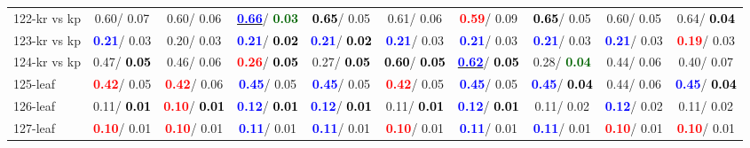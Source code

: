 \begin{table}[h]
\begin{center}
{\begin{tabular}{lc|c|c|c|c|c|c|c|c}
122-kr vs kp &   0.60/  0.07 &   0.60/  0.06 & \underline{\textcolor{blue}{\textbf{  0.66}}}/\textcolor{darkgreen}{\textbf{  0.03}} & \textcolor{black}{\textbf{  0.65}}/  0.05 &   0.61/  0.06 & \textcolor{red}{\textbf{  0.59}}/  0.09 & \textcolor{black}{\textbf{  0.65}}/  0.05 &   0.60/  0.05 &   0.64/\textcolor{black}{\textbf{  0.04}} \\
123-kr vs kp & \textcolor{blue}{\textbf{  0.21}}/  0.03 &   0.20/  0.03 & \textcolor{blue}{\textbf{  0.21}}/\textcolor{black}{\textbf{  0.02}} & \textcolor{blue}{\textbf{  0.21}}/\textcolor{black}{\textbf{  0.02}} & \textcolor{blue}{\textbf{  0.21}}/  0.03 & \textcolor{blue}{\textbf{  0.21}}/  0.03 & \textcolor{blue}{\textbf{  0.21}}/  0.03 & \textcolor{blue}{\textbf{  0.21}}/  0.03 & \textcolor{red}{\textbf{  0.19}}/  0.03 \\
124-kr vs kp &   0.47/\textcolor{black}{\textbf{  0.05}} &   0.46/  0.06 & \textcolor{red}{\textbf{  0.26}}/\textcolor{black}{\textbf{  0.05}} &   0.27/\textcolor{black}{\textbf{  0.05}} & \textcolor{black}{\textbf{  0.60}}/\textcolor{black}{\textbf{  0.05}} & \underline{\textcolor{blue}{\textbf{  0.62}}}/\textcolor{black}{\textbf{  0.05}} &   0.28/\textcolor{darkgreen}{\textbf{  0.04}} &   0.44/  0.06 &   0.40/  0.07 \\ \hline
125-leaf & \textcolor{red}{\textbf{  0.42}}/  0.05 & \textcolor{red}{\textbf{  0.42}}/  0.06 & \textcolor{blue}{\textbf{  0.45}}/  0.05 & \textcolor{blue}{\textbf{  0.45}}/  0.05 & \textcolor{red}{\textbf{  0.42}}/  0.05 & \textcolor{blue}{\textbf{  0.45}}/  0.05 & \textcolor{blue}{\textbf{  0.45}}/\textcolor{black}{\textbf{  0.04}} &   0.44/  0.06 & \textcolor{blue}{\textbf{  0.45}}/\textcolor{black}{\textbf{  0.04}} \\
126-leaf &   0.11/\textcolor{black}{\textbf{  0.01}} & \textcolor{red}{\textbf{  0.10}}/\textcolor{black}{\textbf{  0.01}} & \textcolor{blue}{\textbf{  0.12}}/\textcolor{black}{\textbf{  0.01}} & \textcolor{blue}{\textbf{  0.12}}/\textcolor{black}{\textbf{  0.01}} &   0.11/\textcolor{black}{\textbf{  0.01}} & \textcolor{blue}{\textbf{  0.12}}/\textcolor{black}{\textbf{  0.01}} &   0.11/  0.02 & \textcolor{blue}{\textbf{  0.12}}/  0.02 &   0.11/  0.02 \\
127-leaf & \textcolor{red}{\textbf{  0.10}}/  0.01 & \textcolor{red}{\textbf{  0.10}}/  0.01 & \textcolor{blue}{\textbf{  0.11}}/  0.01 & \textcolor{blue}{\textbf{  0.11}}/  0.01 & \textcolor{red}{\textbf{  0.10}}/  0.01 & \textcolor{blue}{\textbf{  0.11}}/  0.01 & \textcolor{blue}{\textbf{  0.11}}/  0.01 & \textcolor{red}{\textbf{  0.10}}/  0.01 & \textcolor{red}{\textbf{  0.10}}/  0.01 \\

\end{tabular}}
\end{center}
\end{table}
